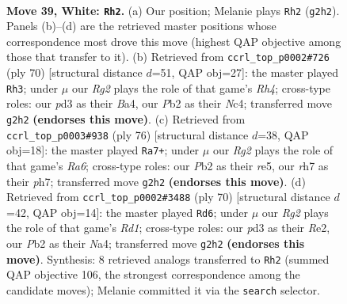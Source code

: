 \documentclass[11pt]{article}
\begin{document}
\clearpage

\begin{figure}[p]\centering
\begin{subfigure}{0.46\textwidth}\centering
\resizebox{\linewidth}{!}{%
\newchessgame
\chessboard[
  setfen={5kr1/5p1r/5n2/8/p3p2p/3p3P/PP3PR1/R1B1K3 w - - 18 39},
  showmover=false,
  pgfstyle=straightmove, color=movearrow, markmove={g2-h2}
]}
\caption{}
\end{subfigure}\hfill
\begin{subfigure}{0.46\textwidth}\centering
\resizebox{\linewidth}{!}{%
\newchessgame
\chessboard[
  setfen={1b1r4/1p1r1k1p/4p2P/1PP2p2/B1Nn3R/8/5P2/1R3K2 w - - 4 36},
  showmover=false,
  pgfstyle=straightmove, color=movearrow, markmove={h4-h3}
]}
\caption{}
\end{subfigure}
\\[4pt]
\begin{subfigure}{0.46\textwidth}\centering
\resizebox{\linewidth}{!}{%
\newchessgame
\chessboard[
  setfen={4n3/6kp/R4rp1/1pPBr3/5p1P/P7/1P6/1K1R4 w - - 1 39},
  showmover=false,
  pgfstyle=straightmove, color=movearrow, markmove={a6-a7}
]}
\caption{}
\end{subfigure}\hfill
\begin{subfigure}{0.46\textwidth}\centering
\resizebox{\linewidth}{!}{%
\newchessgame
\chessboard[
  setfen={1r6/1r1n4/2p2pk1/p5pp/N1P5/6PP/1P2RP2/3R1K2 w - - 6 36},
  showmover=false,
  pgfstyle=straightmove, color=movearrow, markmove={d1-d6}
]}
\caption{}
\end{subfigure}
\caption{\textbf{Move 39, White: \texttt{Rh2}.} (a) Our position; Melanie plays \texttt{Rh2} (\texttt{g2h2}). Panels (b)--(d) are the retrieved master positions whose correspondence most drove this move (highest QAP objective among those that transfer to it). (b) Retrieved from \texttt{ccrl\_top\_p0002\#726} (ply 70) [structural distance $d$=51, QAP obj=27]: the master played \texttt{Rh3}; under $\mu$ our \emph{Rg2} plays the role of that game's \emph{Rh4}; cross-type roles: our \emph{p}d3 as their \emph{B}a4, our \emph{P}b2 as their \emph{N}c4; transferred move \texttt{g2h2} \textbf{(endorses this move)}. (c) Retrieved from \texttt{ccrl\_top\_p0003\#938} (ply 76) [structural distance $d$=38, QAP obj=18]: the master played \texttt{Ra7+}; under $\mu$ our \emph{Rg2} plays the role of that game's \emph{Ra6}; cross-type roles: our \emph{P}b2 as their \emph{r}e5, our \emph{r}h7 as their \emph{p}h7; transferred move \texttt{g2h2} \textbf{(endorses this move)}. (d) Retrieved from \texttt{ccrl\_top\_p0002\#3488} (ply 70) [structural distance $d$=42, QAP obj=14]: the master played \texttt{Rd6}; under $\mu$ our \emph{Rg2} plays the role of that game's \emph{Rd1}; cross-type roles: our \emph{p}d3 as their \emph{R}e2, our \emph{P}b2 as their \emph{N}a4; transferred move \texttt{g2h2} \textbf{(endorses this move)}. Synthesis: 8 retrieved analogs transferred to \texttt{Rh2} (summed QAP objective 106, the strongest correspondence among the candidate moves); Melanie committed it via the \texttt{search} selector.}
\label{fig:thought-m76}
\end{figure}
\end{document}
